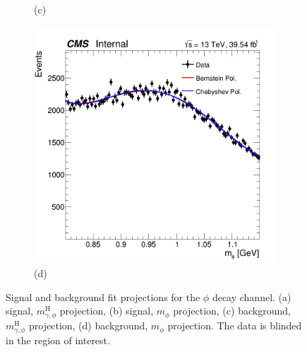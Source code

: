 \begin{figure}[!ht]
\begin{subfigure}[t]{0.50\mylength}
        \vspace*{-0.2cm}
        \caption{\footnotesize (c)}
    \end{subfigure}%
    \begin{subfigure}[t]{0.50\mylength}
        \centering
        \includegraphics[width=0.49\mylength]{resources/plots/Phi3_fit_BKG_MM.png}
        \vspace*{-0.2cm}
        \caption{\footnotesize (d)}
    \end{subfigure}%
\caption{Signal and background fit projections for the $\phi$ decay channel. (a) signal, $m^{\text{H}}_{\gamma, \phi}$ projection, (b) signal, $m_{\phi}$ projection, (c) background, $m^{\text{H}}_{\gamma, \phi}$ projection, (d) background, $m_{\phi}$ projection. The data is blinded in the region of interest.}
\label{fig:sig_bkg_modelling_phi}
    \vspace*{-0.0cm}
\end{figure}

\newpage

